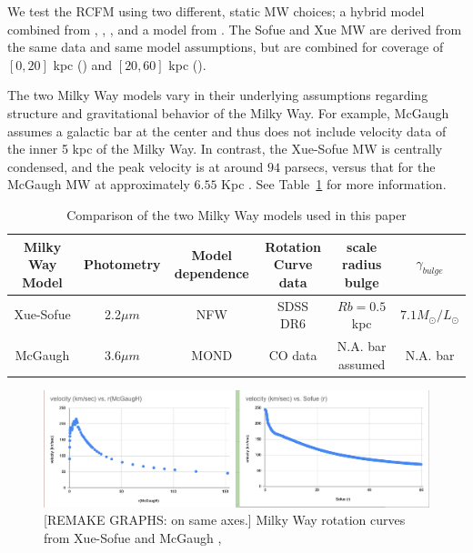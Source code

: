 \documentclass[reprint,%
 amsmath,amssymb,
 aps,
]{revtex4-1}
\begin{document}
 
 We test the RCFM   using two different, static MW choices; 
   a hybrid model combined from  \citet{Xue}, 
  \citet{Sofue}, \cite{sofue2009unified}, and 
  a model from  \citet{McGaugh_2019}. The Sofue and Xue MW are derived from the same data and same model assumptions, but are combined for coverage of   $[0,20]$ kpc
  (\citet{Sofue})   and  $[20,60]$ kpc  (\citet{Xue}). 
  
   The  two Milky Way models vary in their underlying assumptions regarding structure and gravitational behavior of the Milky Way. For example, McGaugh \cite{McGaugh_2019} assumes a galactic bar at the center and thus does not include velocity data of the inner 5 kpc of the Milky Way.  In contrast, the Xue-Sofue MW is centrally condensed, and the peak velocity is   at around $94$ parsecs, versus that for  the McGaugh MW   at  approximately  $6.55$ Kpc   \cite{McGaugh_2019}. See Table~\ref{tab:MWcompare} for more information.
   
   
   

 
    
  
  
  
  \begin{table}[]
      \centering
       \caption{Comparison of the two Milky Way models used in this paper}
      \label{tab:MWcompare}
       \begin{tabular}{|c|c|c|c|c|c|}
      \hline
        Milky Way Model & Photometry                        & Model dependence  & Rotation Curve data & scale radius bulge &$\gamma_{bulge}$\\
 \hline
Xue-Sofue     
&  2.2$ \mu m$
& NFW \cite{1996ApJ...462..563N}     
&SDSS DR6  \cite{Xue}       
& $Rb = 0.5$ kpc    
&$  7.1 M_\odot /L_\odot$  \\
  \hline
 McGaugh       
 & 3.6$\mu m$ 
 &MOND \cite{Milgrom}
 & CO data  \cite{2006ApJ...641..938L}                            
 &  N.A.  bar assumed
 & N.A. bar\\
         \hline
      \end{tabular}
     
  \end{table}
  
  \begin{figure}
    \centering
    \includegraphics[width=\linewidth]{figures/MWXueSofueVMcGaugh.png}
    \caption{[REMAKE GRAPHS:  on same axes.] Milky Way rotation curves
   from Xue-Sofue and McGaugh \cite{sofue2009unified}, \cite{McGaugh_2019} }
    \label{fig:mwSofuevMcGaugh}
\end{figure}
\end{document}
